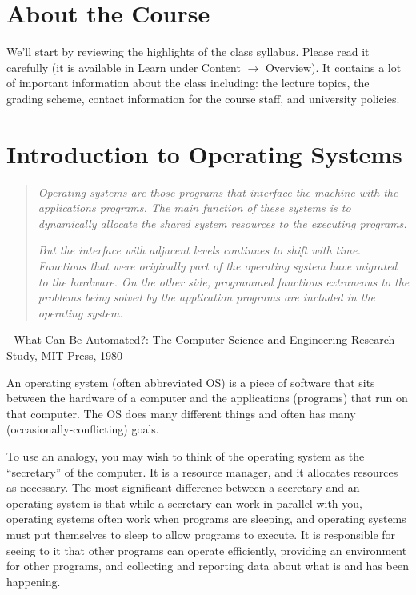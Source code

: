 




\section*{About the Course}
We'll start by reviewing the highlights of the class syllabus. Please read it carefully (it is available in Learn under Content $\rightarrow$ Overview). It contains a lot of important information about the class including: the lecture topics, the grading scheme, contact information for the course staff, and university policies.

\section*{Introduction to Operating Systems}


\begin{quote}
\textit{Operating systems are those programs that interface the machine with the applications programs. The main function of these systems is to dynamically allocate the shared system resources to the executing programs.}

\textit{But the interface with adjacent levels continues to shift with
time. Functions that were originally part of the operating system have migrated to the hardware. On the other side, programmed functions extraneous to the problems being solved by the application programs are included in the operating system.
}
\end{quote}

\hfill - What Can Be Automated?: The Computer Science and Engineering Research Study, MIT Press, 1980

An operating system (often abbreviated OS) is a piece of software that sits between the hardware of a computer and the applications (programs) that run on that computer. The OS does many different things and often has many (occasionally-conflicting) goals. 

To use an analogy, you may wish to think of the operating system as the ``secretary'' of the computer.  It is a resource manager, and it allocates resources as necessary.  The most significant difference between a secretary and an operating system is that while a secretary can work in parallel with you, operating systems often work when programs are sleeping, and operating systems must put themselves to sleep to allow programs to execute. It is responsible for seeing to it that other programs can operate efficiently, providing an environment for other programs, and collecting and reporting data about what is and has been happening.

